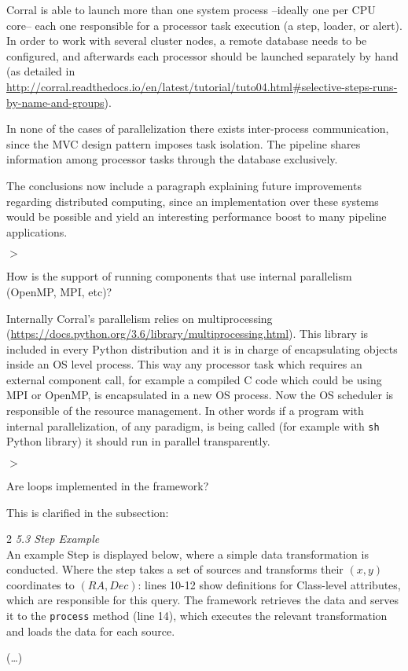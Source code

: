 \documentclass[a4paper,onecolumn,fleqn,usenatbib,useAMS]{mnrasr}
\newenvironment{frshaded}{%
\def\FrameCommand{\fboxrule=\FrameRule\fboxsep=\FrameSep \fcolorbox{framecolor}{shadecolor}}%
\MakeFramed {\FrameRestore}}%
{\endMakeFramed}
\newenvironment{myindentpar}[1]%
 {\begin{list}{}%
         \bigskip
         \color{refereecolor}
         {\setlength{\leftmargin}{#1}}%
         \itshape
         \item[$>$]%
 }
 {\end{list}}
\begin{document}
Corral is able to launch more than one system process --ideally one per CPU core--
each one responsible for a processor task execution (a step, loader, or alert).
%
In order to work with several cluster nodes, a remote database needs to be configured,
and afterwards each processor should be launched separately by hand (as detailed in 
\url{http://corral.readthedocs.io/en/latest/tutorial/tuto04.html#selective-steps-runs-by-name-and-groups}).

In none of the cases of parallelization there exists inter-process communication, since
the MVC design pattern imposes task isolation. 
%
The pipeline shares information among processor tasks through the database exclusively.

The conclusions now include a paragraph explaining future improvements regarding
distributed computing, since an implementation over these systems would be 
possible and yield an interesting performance boost to many pipeline applications.

\begin{myindentpar}{1cm}
How is the support of running components that use internal
parallelism (OpenMP, MPI, etc)? 
\end{myindentpar}

%
Internally Corral's parallelism relies on multiprocessing
(\url{https://docs.python.org/3.6/library/multiprocessing.html}). 
%
This library is included in every Python distribution 
and it is in charge of encapsulating objects inside an OS level process. 
%
This way any processor task which requires an external component call,
for example a compiled C code which could be using MPI or OpenMP, 
is encapsulated in a new OS process. Now the OS scheduler is responsible
of the resource management.
%
In other words if a program with internal parallelization,
of any paradigm,
is being called (for example with \verb|sh| Python library) 
it should run in parallel transparently.


\begin{myindentpar}{1cm}
Are loops implemented in the framework?
\end{myindentpar}

%
This is clarified in the subsection:
\begin{frshaded}
\begin{multicols}{2} 
\textit{5.3 Step Example}\\
An example Step is displayed below, where a simple data transformation
is conducted.
%
Where the step takes a set of sources and transforms 
their $(x,y)$ coordinates to $(RA, Dec)$:
lines 10-12 show definitions for Class-level attributes,
which are responsible for this query. The framework retrieves the data
and serves it to the \texttt{process} method (line 14), which
executes the relevant transformation and loads the data for each
source.

(\ldots)
\end{multicols}\end{frshaded}
      
\end{document}
